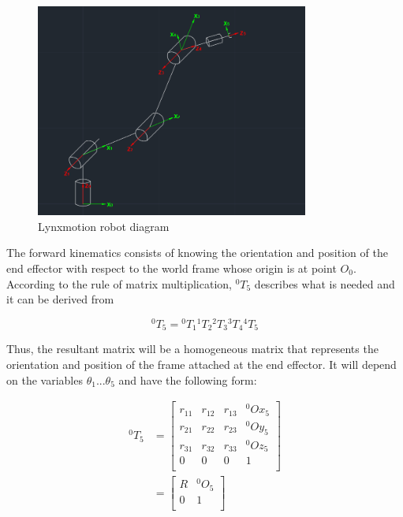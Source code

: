 \documentclass{article}
\newcommand{\T}[2]{{}^{#1}T_{#2}}
\begin{document}
\begin{figure}[htbp]
\begin{center}
\includegraphics[width=0.8\textwidth]{images/diagram}
\caption{Lynxmotion robot diagram}
\label{fig:forward.diagram}
\end{center}
\end{figure}

The forward kinematics consists of knowing the orientation and position of the end effector with respect to the world frame whose origin is at point $O_0$. According to the rule of matrix multiplication, $\T{0}{5}$ describes what is needed and it can be derived from

\begin{equation}
\T{0}{5} = \T{0}{1} \T{1}{2}\T{2}{3}\T{3}{4}\T{4}{5}
\end{equation}

Thus, the resultant matrix will be a homogeneous matrix that represents the orientation and position of the frame attached at the end effector. It will depend on the variables $\theta_1 ... \theta_5$ and have the following form:

\begin{subequations}
\begin{align}
\T{0}{5} & = \left[
\begin{array}{cccc}
	r_{11} & r_{12} & r_{13} & {}^0Ox_5 \\
	r_{21} & r_{22} & r_{23} & {}^0Oy_5 \\
	r_{31} & r_{32} & r_{33} & {}^0Oz_5 \\
	0 & 0 & 0 & 1 \\
\end{array}
\right] \\
& = \left[
\begin{array}{cc}
	R & {}^0O_5 \\
	 0 & 1 \\
\end{array}
\right] 
\end{align}
\end{subequations}
\end{document}
